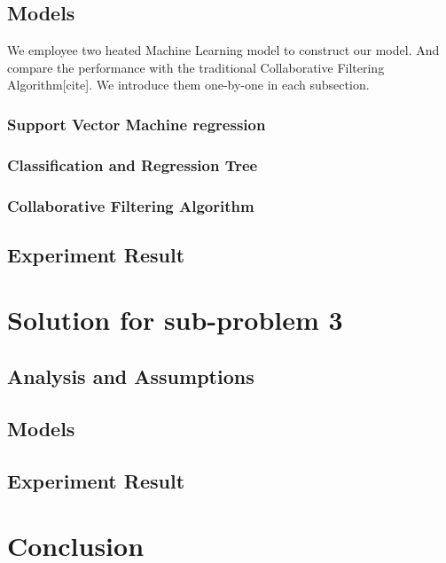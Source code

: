 \subsection{Models}
We employee two heated Machine Learning model to construct our model. And compare the performance with the traditional Collaborative Filtering Algorithm[cite]. We introduce them one-by-one in each subsection.
\subsubsection{Support Vector Machine regression}
\subsubsection{Classification and Regression Tree}
\subsubsection{Collaborative Filtering Algorithm}

\subsection{Experiment Result}


\section{Solution for sub-problem 3}
\subsection{Analysis and Assumptions}
\subsection{Models}
\subsection{Experiment Result}


\section{Conclusion}
